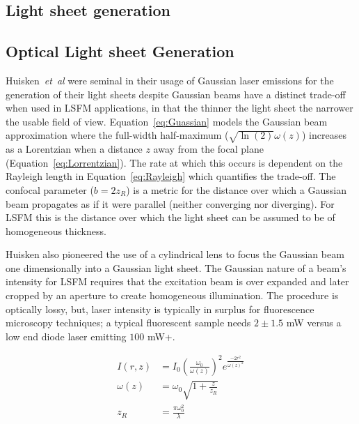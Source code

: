 \subsection{Light sheet generation}
\subsection{Optical Light sheet Generation}

Huisken~\emph{et~al} were seminal in their usage of Gaussian laser emissions for the generation of their light sheets despite Gaussian beams have a distinct trade-off when used in LSFM applications, in that the thinner the light sheet the narrower the usable field of view.
Equation~\eqref{eq:Guassian} models the Gaussian beam approximation where the full-width half-maximum ($\sqrt{\ln(2)}\omega(z)$) %
increases as a Lorentzian when a distance $z$ away from the focal plane (Equation~\eqref{eq:Lorrentzian}).
The rate at which this occurs is dependent on the Rayleigh length in Equation~\eqref{eq:Rayleigh} which quantifies the trade-off.
The confocal parameter ($b=2z_R$) is a metric for the distance over which a Gaussian beam propagates as if it were parallel (neither converging nor diverging).
For LSFM this is the distance over which the light sheet can be assumed to be of homogeneous thickness.

Huisken also pioneered the use of a cylindrical lens to focus the Gaussian beam one dimensionally into a Gaussian light sheet.
The Gaussian nature of a beam's intensity for LSFM requires that the excitation beam is over expanded and later cropped by an aperture to create homogeneous illumination.
The procedure is optically lossy, but, laser intensity is typically in surplus for fluorescence microscopy techniques; a typical fluorescent sample needs $2\pm 1.5$ mW versus a low end diode laser emitting $100$ mW+.


\begin{align}
	I(r,z)    & = {I_0} {\left(\frac{\omega_0}{\omega{(z)}}\right)}^2 {e^{\frac{-2r^2}{\omega{(z)}^2}}\label{eq:Guassian}} \\
	\omega(z) & = \omega_0 \sqrt{1+\frac{z}{z_R}} \label{eq:Lorrentzian}                                                   \\
	z_R       & = \frac{\pi\omega_0^2}{\lambda} \label{eq:Rayleigh}
\end{align}

